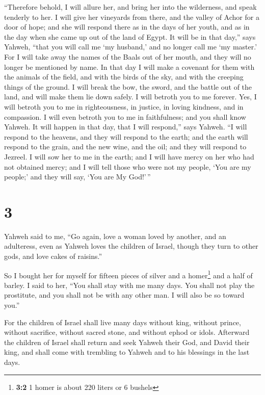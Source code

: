  ``Therefore behold, I will allure her, and bring her
into the wilderness, and speak tenderly to her.  I will
give her vineyards from there, and the valley of Achor for a door of
hope; and she will respond there as in the days of her youth, and as in
the day when she came up out of the land of Egypt.  It
will be in that day,'' says Yahweh, ``that you will call me `my
husband,' and no longer call me `my master.'  For I will
take away the names of the Baals out of her mouth, and they will no
longer be mentioned by name.  In that day I will make a
covenant for them with the animals of the field, and with the birds of
the sky, and with the creeping things of the ground. I will break the
bow, the sword, and the battle out of the land, and will make them lie
down safely.  I will betroth you to me forever. Yes, I
will betroth you to me in righteousness, in justice, in loving kindness,
and in compassion.  I will even betroth you to me in
faithfulness; and you shall know Yahweh.  It will happen
in that day, that I will respond,'' says Yahweh. ``I will respond to the
heavens, and they will respond to the earth;  and the
earth will respond to the grain, and the new wine, and the oil; and they
will respond to Jezreel.  I will sow her to me in the
earth; and I will have mercy on her who had not obtained mercy; and I
will tell those who were not my people, `You are my people;' and they
will say, `You are My God!'\,''

\hypertarget{section-2}{%
\section{3}\label{section-2}}

 Yahweh said to me, ``Go again, love a woman loved by
another, and an adulteress, even as Yahweh loves the children of Israel,
though they turn to other gods, and love cakes of raisins.''

 So I bought her for myself for fifteen pieces of silver
and a homer\footnote{\textbf{3:2} 1 homer is about 220 liters or 6
  bushels} and a half of barley.  I said to her, ``You
shall stay with me many days. You shall not play the prostitute, and you
shall not be with any other man. I will also be so toward you.''

 For the children of Israel shall live many days without
king, without prince, without sacrifice, without sacred stone, and
without ephod or idols.  Afterward the children of Israel
shall return and seek Yahweh their God, and David their king, and shall
come with trembling to Yahweh and to his blessings in the last days.

